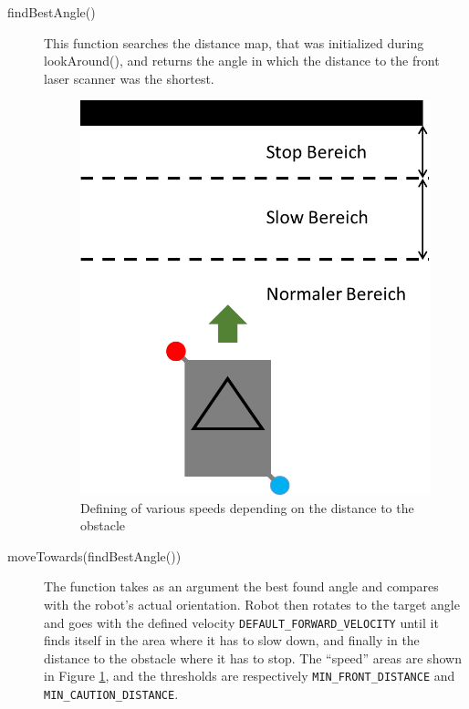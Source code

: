 \begin{description}
\item[findBestAngle()] This function searches the distance map, that was initialized during lookAround(), and returns the angle in which the distance to the front laser scanner was the shortest. 

\begin{figure}[h]
\centering
\includegraphics[scale=0.6]{graphics/Zone.png}
\caption{Defining of various speeds depending on the distance to the obstacle}
\label{Zone}
\centering
\end{figure}

\item[moveTowards(findBestAngle())] The function takes as an argument the best found angle and compares with the robot's actual orientation. Robot then rotates to the target angle and goes with the defined velocity \texttt{DEFAULT\_FORWARD\_VELOCITY}
 until it finds itself in the area where it has to slow down, and finally in the distance to the obstacle where it has to stop. The ``speed'' areas are shown in Figure \ref{Zone}, and the thresholds are respectively \texttt{MIN\_FRONT\_DISTANCE} and \texttt{MIN\_CAUTION\_DISTANCE}. 
 

\end{description}
